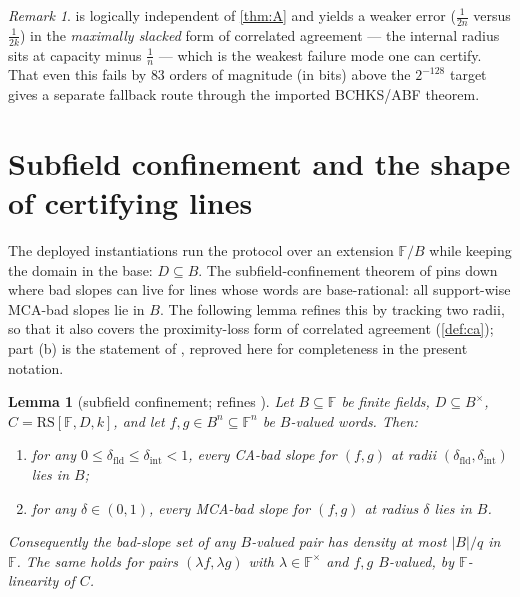 \documentclass[11pt]{article}
\newtheorem{lemma}[theorem]{Lemma}
\theoremstyle{definition}
\theoremstyle{remark}
\newtheorem{remark}[theorem]{Remark}
\newcommand{\F}{\mathbb{F}}
\newcommand{\B}{B}
\newcommand{\RS}{\mathrm{RS}}
\begin{document}
\begin{remark}
 is logically independent of \cref{thm:A} and yields a weaker error ($\frac1{2n}$ versus $\frac1{2k}$) in the \emph{maximally slacked} form of correlated agreement --- the internal radius sits at capacity minus $\frac1n$ --- which is the weakest failure mode one can certify. That even this fails by $83$ orders of magnitude (in bits) above the $2^{-128}$ target gives a separate fallback route through the imported BCHKS/ABF theorem.
\end{remark}

\section{Subfield confinement and the shape of certifying lines}\label{sec:subfield}

The deployed instantiations run the protocol over an extension $\F/\B$ while keeping the domain in the base: $D\subseteq\B$. The subfield-confinement theorem of \cite[Thm.\ ``Subfield confinement'']{Cho26b} pins down where bad slopes can live for lines whose words are base-rational: all support-wise MCA-bad slopes lie in $\B$. The following lemma refines this by tracking two radii, so that it also covers the proximity-loss form of correlated agreement (\cref{def:ca}); part (b) is the statement of \cite{Cho26b}, reproved here for completeness in the present notation.

\begin{lemma}[subfield confinement; refines {\cite{Cho26b}}]\label{lem:confine}
Let $\B\subseteq\F$ be finite fields, $D\subseteq\B^\times$, $C=\RS[\F,D,k]$, and let $f,g\in\B^n\subseteq\F^n$ be $\B$-valued words. Then:
\begin{enumerate}[label=\textup{(\alph*)}]
\item for any $0\le\delta_{\mathrm{fld}}\le\delta_{\mathrm{int}}<1$, every CA-bad slope for $(f,g)$ at radii $(\delta_{\mathrm{fld}},\delta_{\mathrm{int}})$ lies in $\B$;
\item for any $\delta\in(0,1)$, every MCA-bad slope for $(f,g)$ at radius $\delta$ lies in $\B$.
\end{enumerate}
Consequently the bad-slope set of any $\B$-valued pair has density at most $|\B|/q$ in $\F$. The same holds for pairs $(\lambda f,\lambda g)$ with $\lambda\in\F^\times$ and $f,g$ $\B$-valued, by $\F$-linearity of $C$.
\end{lemma}
\end{document}
